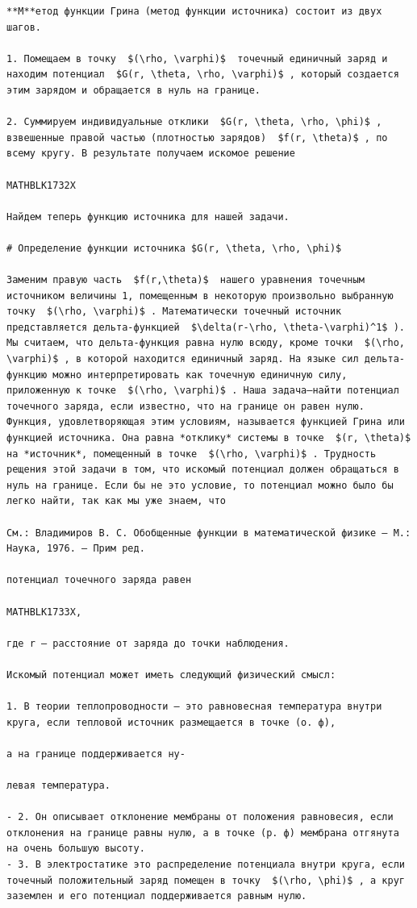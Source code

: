\documentclass[
]{article}
\begin{document}
\begin{verbatim}
**М**етод функции Грина (метод функции источника) состоит из двух шагов.

1. Помещаем в точку  $(\rho, \varphi)$  точечный единичный заряд и находим потенциал  $G(r, \theta, \rho, \varphi)$ , который создается этим зарядом и обращается в нуль на границе.

2. Суммируем индивидуальные отклики  $G(r, \theta, \rho, \phi)$ , взвешенные правой частью (плотностью зарядов)  $f(r, \theta)$ , по всему кругу. В результате получаем искомое решение

MATHBLK1732X

Найдем теперь функцию источника для нашей задачи.

# Определение функции источника $G(r, \theta, \rho, \phi)$

Заменим правую часть  $f(r,\theta)$  нашего уравнения точечным источником величины 1, помещенным в некоторую произвольно выбранную точку  $(\rho, \varphi)$ . Математически точечный источник представляется дельта-функцией  $\delta(r-\rho, \theta-\varphi)^1$ ). Мы считаем, что дельта-функция равна нулю всюду, кроме точки  $(\rho, \varphi)$ , в которой находится единичный заряд. На языке сил дельта-функцию можно интерпретировать как точечную единичную силу, приложенную к точке  $(\rho, \varphi)$ . Наша задача—найти потенциал точечного заряда, если известно, что на границе он равен нулю. Функция, удовлетворяющая этим условиям, называется функцией Грина или функцией источника. Она равна *отклику* системы в точке  $(r, \theta)$  на *источник*, помещенный в точке  $(\rho, \varphi)$ . Трудность рещения этой задачи в том, что искомый потенциал должен обращаться в нуль на границе. Если бы не это условие, то потенциал можно было бы легко найти, так как мы уже знаем, что

См.: Владимиров В. С. Обобщенные функции в математической физике — М.: Наука, 1976. — Прим ред.

потенциал точечного заряда равен

MATHBLK1733X,

где r — расстояние от заряда до точки наблюдения.

Искомый потенциал может иметь следующий физический смысл:

1. В теории теплопроводности — это равновесная температура внутри круга, если тепловой источник размещается в точке (о. ф),

а на границе поддерживается ну-

левая температура.

- 2. Он описывает отклонение мембраны от положения равновесия, если отклонения на границе равны нулю, а в точке (р. ф) мембрана отгянута на очень большую высоту.
- 3. В электростатике это распределение потенциала внутри круга, если точечный положительный заряд помещен в точку  $(\rho, \phi)$ , а круг заземлен и его потенциал поддерживается равным нулю.


\end{verbatim}
\end{document}
